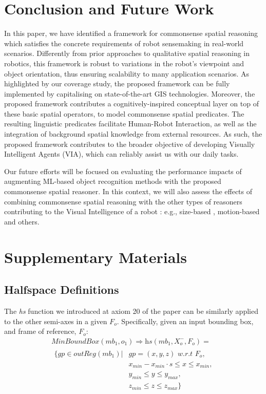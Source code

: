 \documentclass{article}
\begin{document}
\section{Conclusion and Future Work}
In this paper, we have identified a framework for commonsense spatial reasoning which satisfies the concrete requirements of robot sensemaking in real-world scenarios. Differently from prior approaches to qualitative spatial reasoning in robotics, this framework is robust to variations in the robot's viewpoint and object orientation, thus ensuring scalability to many application scenarios. As highlighted by our coverage study, the proposed framework can be fully implemented by capitalising on  state-of-the-art GIS technologies. Moreover, the proposed framework contributes a cognitively-inspired conceptual layer on top of these basic spatial operators, to model commonsense spatial predicates. The resulting linguistic predicates facilitate Human-Robot Interaction, as well as the integration of background spatial knowledge from external resources. As such, the proposed framework contributes to the broader objective of developing Visually Intelligent Agents (VIA), which can reliably assist us with our daily tasks. 

Our future efforts will be focused on evaluating the performance impacts of augmenting ML-based object recognition methods with the proposed commonsense spatial reasoner. In this context, we will also assess the effects of combining commonsense spatial reasoning with the other types of reasoners contributing to the Visual Intelligence of a robot \cite{chiatti_towards_2020}: e.g., size-based \cite{chiatti2021aaaimake}, motion-based and others.   

\appendix
\section{Supplementary Materials}
\subsection{Halfspace Definitions}
The \textit{hs} function we introduced at axiom 20 of the paper can be similarly applied to the other semi-axes in a given $F_o$. Specifically, given an input bounding box, and frame of reference, $F_o$:
\begin{multline}
    \textit{MinBoundBox}(mb_1,o_1) \Rightarrow  \textit{hs}(mb_1,X_{o}^{-}, F_o) = \\
\begin{split}
    \{gp \in \textit{outReg}(mb_1)| &{} gp=(x,y,z) \textit{ w.r.t } F_o,   \\
   & x_{min} - x_{min}\cdot s \leq x \leq x_{min} , \\
   &  y_{min} \leq y \leq y_{max}, \\
   &  z_{min} \leq z \leq z_{max}  \} 
   \end{split}
\end{multline}
\end{document}
